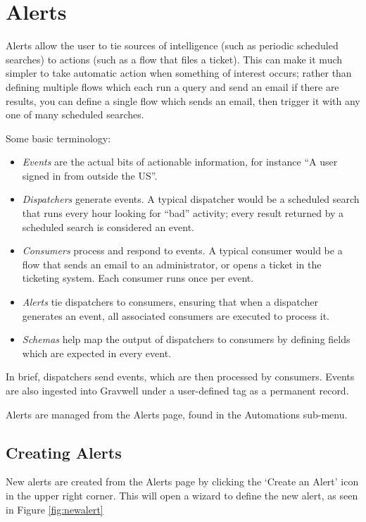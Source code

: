 \section{Alerts}
Alerts allow the user to tie sources of intelligence (such as periodic scheduled searches) to actions (such as a flow that files a ticket). This can make it much simpler to take automatic action when something of interest occurs; rather than defining multiple flows which each run a query and send an email if there are results, you can define a single flow which sends an email, then trigger it with any one of many scheduled searches.

Some basic terminology:

\begin{itemize}
  \tightlist
  \item \emph{Events} are the actual bits of actionable information, for instance ``A user signed in from outside the US''.
  \item \emph{Dispatchers} generate events. A typical dispatcher would be a scheduled search that runs every hour looking for ``bad'' activity; every result returned by a scheduled search is considered an event.
  \item \emph{Consumers} process and respond to events. A typical consumer would be a flow that sends an email to an administrator, or opens a ticket in the ticketing system. Each consumer runs once per event.
  \item \emph{Alerts} tie dispatchers to consumers, ensuring that when a dispatcher generates an event, all associated consumers are executed to process it.
  \item \emph{Schemas} help map the output of dispatchers to consumers by defining fields which are expected in every event.
\end{itemize}

In brief, dispatchers send events, which are then processed by consumers. Events are also ingested into Gravwell under a user-defined tag as a permanent record.

Alerts are managed from the Alerts page, found in the Automations sub-menu.

\subsection{Creating Alerts}
New alerts are created from the Alerts page by clicking the `Create an Alert' icon in the upper right corner. This will open a wizard to define the new alert, as seen in Figure \ref{fig:newalert}

